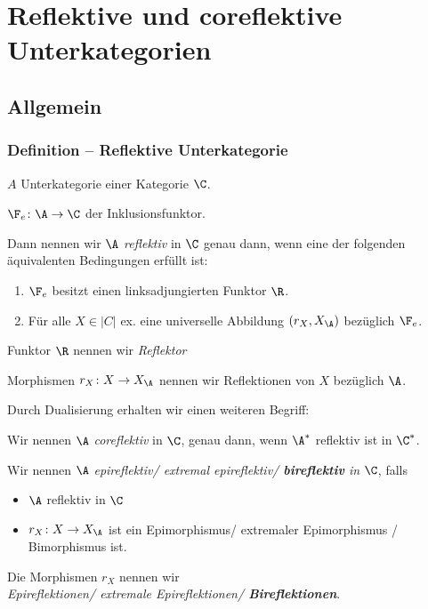 \section{Reflektive und coreflektive Unterkategorien}

\subsection{Allgemein}

\begin{frame}
  \frametitle{Definition -- Reflektive Unterkategorie}
  $A$ Unterkategorie einer Kategorie $\C$.
  
  $\F_e \colon \A \to \C$ der Inklusionsfunktor.

  Dann nennen wir $\A$ \emph{reflektiv} in $\C$ genau dann, wenn eine der folgenden äquivalenten Bedingungen erfüllt ist:
  \begin{enumerate}[(1)]
    \item $\F_e$ besitzt einen linksadjungierten Funktor $\R$.
    \item Für alle $X \in |C|$ ex. eine universelle Abbildung $(r_X, X_\A)$ bezüglich $\F_e$.
  \end{enumerate}

  \pause
  \vspace{1em}
  Funktor $\R$ nennen wir \emph{Reflektor}
  
  Morphismen $r_X \colon X \to X_\A$ nennen wir Reflektionen von $X$ bezüglich $\A$.

  \pause
  \vspace{1em}
  Durch Dualisierung erhalten wir einen weiteren Begriff:

  Wir nennen $\A$ \emph{coreflektiv} in $\C$, genau dann, wenn $\A^*$ reflektiv ist in $\C^*$. 

  \pause
  \vspace{1em}

  Wir nennen $\A$ \emph{epireflektiv/ extremal epireflektiv/ \textbf{bireflektiv} in} $\C$, falls 
  \pause
  \begin{itemize}
    \item  $\A$ reflektiv in $\C$
    \item  $r_X \colon X \to X_\A$ ist ein Epimorphismus/ extremaler Epimorphismus / Bimorphismus ist.
  \end{itemize}
   
  Die Morphismen $r_X$ nennen wir \\\emph{Epireflektionen/ extremale Epireflektionen/ \textbf{Bireflektionen}}.
\end{frame}

